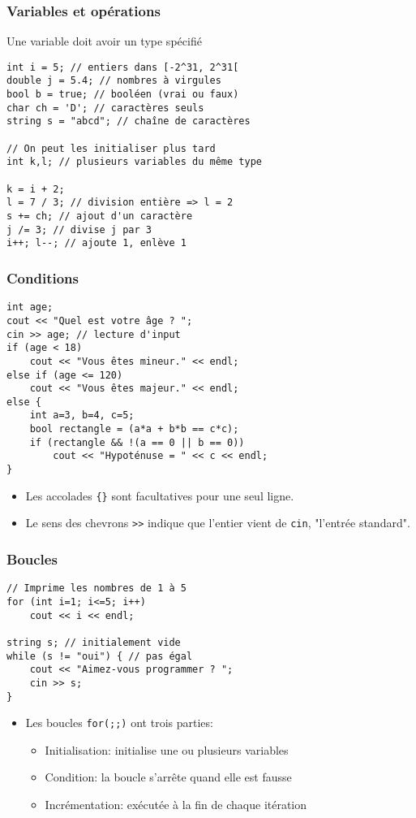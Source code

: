 \documentclass[12pt]{beamer}
\begin{document}
\begin{frame}[fragile]
\frametitle{Variables et opérations}
Une variable doit avoir un type spécifié
\begin{lstlisting}
int i = 5; // entiers dans [-2^31, 2^31[
double j = 5.4; // nombres à virgules
bool b = true; // booléen (vrai ou faux)
char ch = 'D'; // caractères seuls
string s = "abcd"; // chaîne de caractères

// On peut les initialiser plus tard
int k,l; // plusieurs variables du même type

k = i + 2;
l = 7 / 3; // division entière => l = 2
s += ch; // ajout d'un caractère
j /= 3; // divise j par 3
i++; l--; // ajoute 1, enlève 1
\end{lstlisting}
\end{frame}

\begin{frame}[fragile]
\frametitle{Conditions}
\begin{lstlisting}
int age;
cout << "Quel est votre âge ? ";
cin >> age; // lecture d'input
if (age < 18)
    cout << "Vous êtes mineur." << endl;
else if (age <= 120)
    cout << "Vous êtes majeur." << endl;
else {
    int a=3, b=4, c=5;
    bool rectangle = (a*a + b*b == c*c);
    if (rectangle && !(a == 0 || b == 0))
        cout << "Hypoténuse = " << c << endl;
}
\end{lstlisting}
\begin{itemize}
\item Les accolades \lstinline|{}| sont facultatives pour une seul ligne.
\item Le sens des chevrons \lstinline|>>| indique que l'entier vient de \lstinline|cin|, "l'entrée standard".
\end{itemize}
\end{frame}

\begin{frame}[fragile]
\frametitle{Boucles}
\begin{lstlisting}
// Imprime les nombres de 1 à 5
for (int i=1; i<=5; i++)
    cout << i << endl;

string s; // initialement vide
while (s != "oui") { // pas égal
    cout << "Aimez-vous programmer ? ";
    cin >> s;
}
\end{lstlisting}
\begin{itemize}
\item Les boucles \lstinline|for(;;)| ont trois parties:
\begin{itemize}
\item Initialisation: initialise une ou plusieurs variables
\item Condition: la boucle s'arrête quand elle est fausse
\item Incrémentation: exécutée à la fin de chaque itération
\end{itemize}
\end{itemize}
\end{frame}
\end{document}
